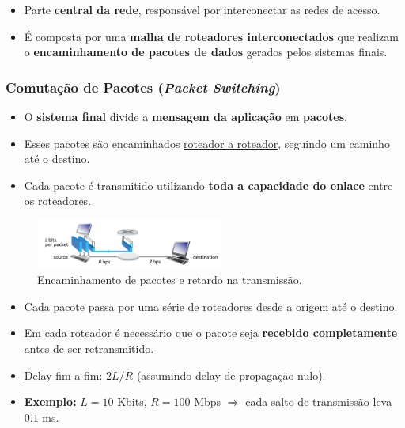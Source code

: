     \begin{itemize}[left=0.5cm, align=left, nosep]
        \item Parte \textbf{central da rede}, responsável por interconectar as redes de acesso.
        \item É composta por uma \textbf{malha de roteadores interconectados} que realizam o \textbf{encaminhamento de pacotes de dados} gerados pelos sistemas finais.
    \end{itemize}

    \subsubsection*{Comutação de Pacotes (\textit{Packet Switching})}
    \begin{itemize}[left=0.5cm, align=left, nosep]
        \item O \textbf{sistema final} divide a \textbf{mensagem da aplicação} em \textbf{pacotes}.
        \item Esses pacotes são encaminhados \underline{roteador a roteador}, seguindo um caminho até o destino.
        \item Cada pacote é transmitido utilizando \textbf{toda a capacidade do enlace} entre os roteadores.
    \end{itemize}

    \begin{figure}[H]
        \centering
        \includegraphics[width=0.55\textwidth]{img/cap-01/retardo.png}
        \caption{Encaminhamento de pacotes e retardo na transmissão.}
    \end{figure}

    \begin{itemize}[left=0.5cm, align=left, nosep]
        \item Cada pacote passa por uma série de roteadores desde a origem até o destino.
        \item Em cada roteador é necessário que o pacote seja \textbf{recebido completamente} antes de ser retransmitido.
        \item \underline{Delay fim-a-fim}: $2L/R$ (assumindo delay de propagação nulo).
        \item \textbf{Exemplo:} $L = 10$ Kbits, $R = 100$ Mbps $\Rightarrow$ cada salto de transmissão leva $0.1$ ms.
    \end{itemize}

